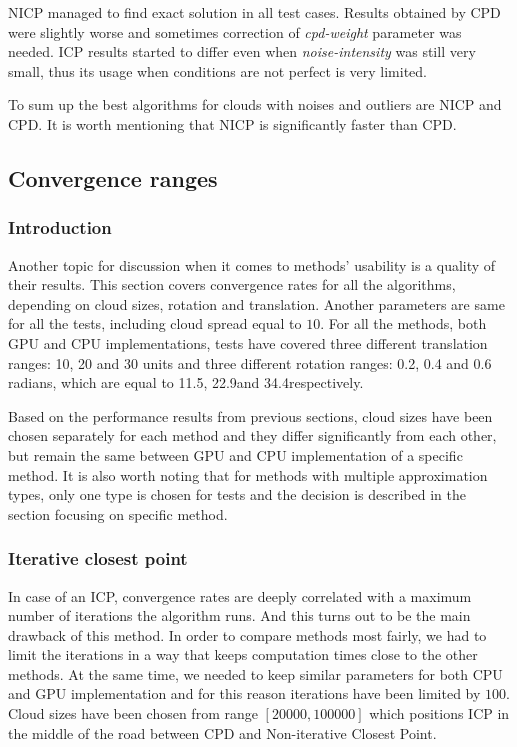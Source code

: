 \documentclass[titlepage]{article}
\begin{document}
NICP managed to find exact solution in all test cases. Results obtained by CPD were slightly worse and sometimes correction of \textit{cpd-weight} parameter was needed. ICP results started to differ even when \textit{noise-intensity} was still very small, thus its usage when conditions are not perfect is very limited.

To sum up the best algorithms for clouds with noises and outliers are NICP and CPD. It is worth mentioning that NICP is significantly faster than CPD. 


\subsection{Convergence ranges}

\subsubsection{Introduction}
Another topic for discussion when it comes to methods' usability is a quality of their results. This section covers convergence rates for all the algorithms, depending on cloud sizes, rotation and translation. Another parameters are same for all the tests, including cloud spread equal to $10$. For all the methods, both GPU and CPU implementations, tests have covered three different translation ranges: 10, 20 and 30 units and three different rotation ranges: 0.2, 0.4 and 0.6 radians, which are equal to 11.5\degree, 22.9\degree and 34.4\degree respectively.

Based on the performance results from previous sections, cloud sizes have been chosen separately for each method and they differ significantly from each other, but remain the same between GPU and CPU implementation of a specific method. It is also worth noting that for methods with multiple approximation types, only one type is chosen for tests and the decision is described in the section focusing on specific method.

\subsubsection{Iterative closest point}
In case of an ICP, convergence rates are deeply correlated with a maximum number of iterations the algorithm runs. And this turns out to be the main drawback of this method. In order to compare methods most fairly, we had to limit the iterations in a way that keeps computation times close to the other methods. At the same time, we needed to keep similar parameters for both CPU and GPU implementation and for this reason iterations have been limited by $100$. Cloud sizes have been chosen from range $[20000,100000]$ which positions ICP in the middle of the road between CPD and Non-iterative Closest Point.
\end{document}
